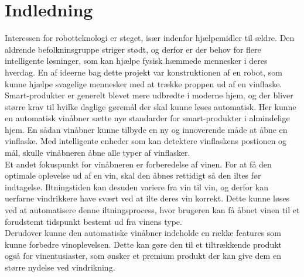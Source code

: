 \chapter{Indledning}
Interessen for robotteknologi er steget, især indenfor hjælpemidler til ældre. Den aldrende befolkninsgruppe striger stødt, og derfor er der behov for flere 
intelligente løsninger, som kan hjælpe fysisk hæmmede mennesker i deres hverdag. En af ideerne bag dette projekt var konstruktionen af en robot, som kunne hjælpe 
svagelige mennesker med at trække proppen ud af en vinflaske.\\

Smart-produkter er generelt blevet mere udbredte i moderne hjem, og der bliver større krav til hvilke daglige gøremål der skal kunne løses automatisk. Her kunne 
en automatisk vinåbner sætte nye standarder for smart-produkter i almindelige hjem. En sådan vinåbner kunne tilbyde en ny og innoverende måde at åbne en 
vinflaske. Med intelligente enheder som kan detektere vinflaskens postionen og mål, skulle vinåbneren åbne alle typer af vinflasker. \\

Et andet fokuspunkt for vinåbneren er forberedelse af vinen. For at få den optimale oplevelse ud af en vin, skal den åbnes rettidigt så den iltes før indtagelse.
Iltningstiden kan desuden variere fra vin til vin, og derfor kan uerfarne vindrikkere have svært ved at ilte deres vin korrekt. Dette kunne løses ved at 
automatisere denne iltningsprocess, hvor brugeren kan få åbnet vinen til et forudstemt tidspunkt bestemt ud fra vinens type.\\

Derudover kunne den automatiske vinåbner indeholde en række features som kunne forbedre vinoplevelsen. Dette kan gøre den til et tiltrækkende produkt også for 
vinentusiaster, som ønsker et premium produkt der kan give dem en større nydelse ved vindrikning.\\


